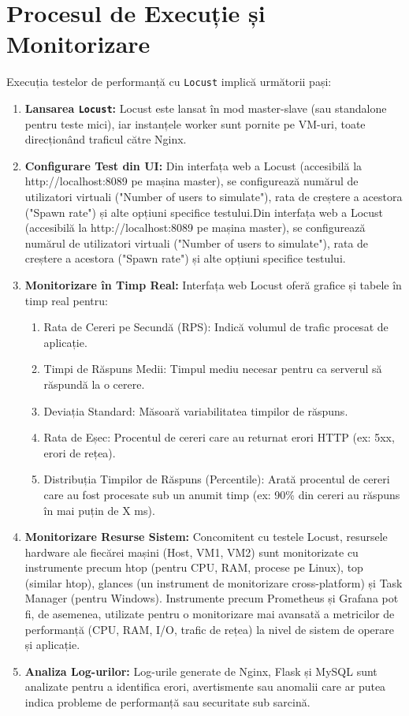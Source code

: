\documentclass[12pt, a4paper, oneside, romanian]{teza-upb}
\begin{document}
\section{Procesul de Execuție și Monitorizare}
Execuția testelor de performanță cu \texttt{Locust} implică următorii pași:
\begin{enumerate}
	\item \textbf{Lansarea \texttt{Locust}:} Locust este lansat în mod master-slave (sau standalone pentru teste mici), iar instanțele worker sunt pornite pe VM-uri, toate direcționând traficul către Nginx.
	
	\item \textbf{Configurare Test din UI:} Din interfața web a Locust (accesibilă la http://localhost:8089 pe mașina master), se configurează numărul de utilizatori virtuali ("Number of users to simulate"), rata de creștere a acestora ("Spawn rate") și alte opțiuni specifice testului.Din interfața web a Locust (accesibilă la http://localhost:8089 pe mașina master), se configurează numărul de utilizatori virtuali ("Number of users to simulate"), rata de creștere a acestora ("Spawn rate") și alte opțiuni specifice testului.
	
	
	\item \textbf{Monitorizare în Timp Real:} Interfața web Locust oferă grafice și tabele în timp real pentru:
	\begin{enumerate}
		\item Rata de Cereri pe Secundă (RPS): Indică volumul de trafic procesat de aplicație.
		\item Timpi de Răspuns Medii: Timpul mediu necesar pentru ca serverul să răspundă la o cerere.
		\item Deviația Standard: Măsoară variabilitatea timpilor de răspuns.
		\item Rata de Eșec: Procentul de cereri care au returnat erori HTTP (ex: 5xx, erori de rețea).
		\item Distribuția Timpilor de Răspuns (Percentile): Arată procentul de cereri care au fost procesate sub un anumit timp (ex: 90\% din cereri au răspuns în mai puțin de X ms).
	\end{enumerate}
	
	\item \textbf{Monitorizare Resurse Sistem:} Concomitent cu testele Locust, resursele hardware ale fiecărei mașini (Host, VM1, VM2) sunt monitorizate cu instrumente precum htop (pentru CPU, RAM, procese pe Linux), top (similar htop), glances (un instrument de monitorizare cross-platform) și Task Manager (pentru Windows). Instrumente precum Prometheus și Grafana pot fi, de asemenea, utilizate pentru o monitorizare mai avansată a metricilor de performanță (CPU, RAM, I/O, trafic de rețea) la nivel de sistem de operare și aplicație.
	
	\item \textbf{Analiza Log-urilor:} Log-urile generate de Nginx, Flask și MySQL sunt analizate pentru a identifica erori, avertismente sau anomalii care ar putea indica probleme de performanță sau securitate sub sarcină.
\end{enumerate}
\end{document}
